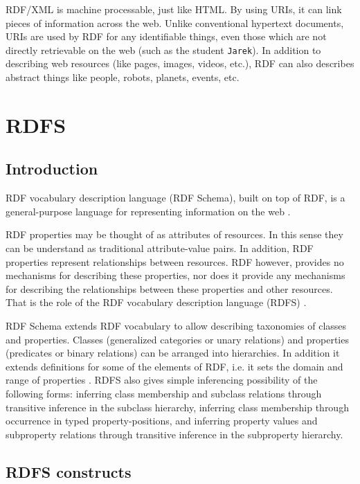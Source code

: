 RDF\slash XML is machine processable, just like HTML. By using URIs, it can link pieces of information across the web. Unlike conventional hypertext documents, URIs are used by RDF for any identifiable things, even those which are not directly retrievable on the web (such as the student \texttt{Jarek}). In addition to describing web resources (like pages, images, videos, etc.), RDF can also describes abstract things like people, robots, planets, events, etc. \cite{RDFPrimer}

\section{RDFS}
\label{sec:rdfs}

\subsection{Introduction}
\label{sub:rdfsIntroduction}

RDF vocabulary description language (RDF Schema), built on top of RDF, is a general-purpose language for representing information on the web \cite{RDFSchema}. 

RDF properties may be thought of as attributes of resources. In this sense they can be understand as traditional attribute-value pairs. In addition, RDF properties represent relationships between resources. RDF however, provides no mechanisms for describing these properties, nor does it provide any mechanisms for describing the relationships between these properties and other resources. That is the role of the RDF vocabulary description language (RDFS) \cite{RDFSchema}.

RDF Schema extends RDF vocabulary to allow describing taxonomies of classes and properties. Classes (generalized categories or unary relations) and properties (predicates or binary relations) can be arranged into hierarchies. In addition it extends definitions for some of the elements of RDF, i.e. it sets the domain and range of properties \cite{SemWebIntro}. RDFS also gives simple inferencing possibility of the following forms: inferring class membership and subclass relations through transitive inference in the subclass hierarchy, inferring class membership through occurrence in typed property-positions, and inferring property values and subproperty relations through transitive inference in the subproperty hierarchy. 

\newpage

\subsection{RDFS constructs}
\label{sub:rdfsConstructs}

